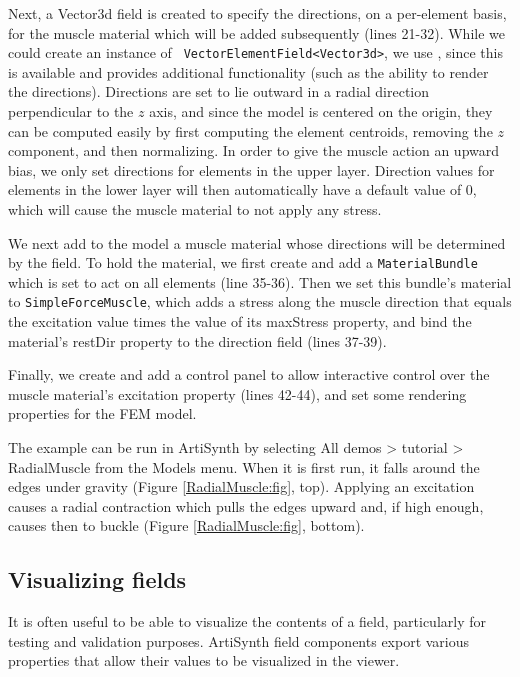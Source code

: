 Next, a Vector3d field is created to specify the directions, on a
per-element basis, for the muscle material which will be added subsequently
(lines 21-32). While we could create an instance of {\tt
VectorElementField<Vector3d>}, we use
, since this
is available and provides additional functionality (such as the
ability to render the directions). Directions are set to lie outward
in a radial direction perpendicular to the $z$ axis, and since the
model is centered on the origin, they can be computed easily by first
computing the element centroids, removing the $z$ component, and then
normalizing. In order to give the muscle action an upward bias, we
only set directions for elements in the upper layer. Direction values
for elements in the lower layer will then automatically have a default
value of 0, which will cause the muscle material to not apply any
stress.

We next add to the model a muscle material whose directions will be
determined by the field. To hold the material, we first create and add
a {\tt MaterialBundle} which is set to act on all elements (line
35-36). Then we set this bundle's material to {\tt SimpleForceMuscle},
which adds a stress along the muscle direction that equals the
excitation value times the value of its {\sf maxStress} property, and
bind the material's {\sf restDir} property to the direction field
(lines 37-39).

Finally, we create and add a control panel to allow interactive
control over the muscle material's excitation property (lines 42-44),
and set some rendering properties for the FEM model.


The example can be run in ArtiSynth by selecting {\sf All demos >
tutorial > RadialMuscle} from the {\sf Models} menu.  When it is first
run, it falls around the edges under gravity (Figure
\ref{RadialMuscle:fig}, top). Applying an excitation causes a radial
contraction which pulls the edges upward and, if high enough, causes
then to buckle (Figure \ref{RadialMuscle:fig}, bottom).


\subsection{Visualizing fields}

It is often useful to be able to visualize the contents of a field,
particularly for testing and validation purposes. ArtiSynth field
components export various properties that allow their values to be
visualized in the viewer.

